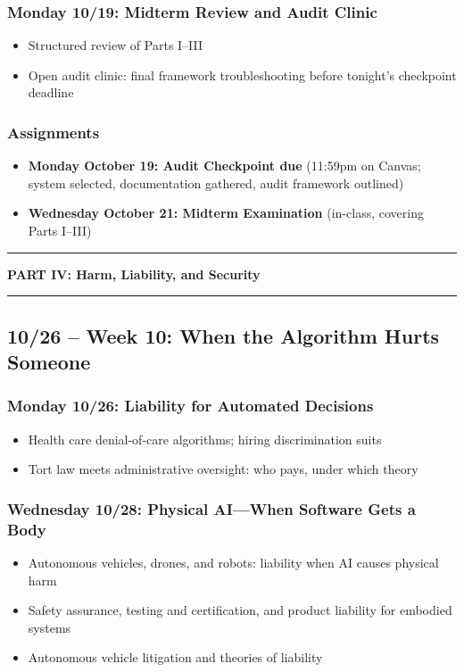 \documentclass[12pt]{article}
\begin{document}
    \subsubsection*{Monday 10/19: Midterm Review and Audit Clinic}
        \begin{itemize}
            \item Structured review of Parts I--III
            \item Open audit clinic: final framework troubleshooting before tonight's checkpoint deadline
        \end{itemize}
    \subsubsection*{Assignments}
        \begin{itemize}
            \item \textbf{Monday October 19: Audit Checkpoint due} (11:59pm on Canvas; system selected, documentation gathered, audit framework outlined)
            \item \textbf{Wednesday October 21: Midterm Examination} (in-class, covering Parts I--III)
        \end{itemize}

\bigskip
\noindent\rule{\textwidth}{0.6pt}
\begin{center}\textbf{PART IV: Harm, Liability, and Security}\end{center}
\noindent\rule{\textwidth}{0.6pt}

\subsection*{10/26 -- Week 10: When the Algorithm Hurts Someone}
    \subsubsection*{Monday 10/26: Liability for Automated Decisions}
        \begin{itemize}
            \item Health care denial-of-care algorithms; hiring discrimination suits
            \item Tort law meets administrative oversight: who pays, under which theory
        \end{itemize}
    \subsubsection*{Wednesday 10/28: Physical AI---When Software Gets a Body}
        \begin{itemize}
            \item Autonomous vehicles, drones, and robots: liability when AI causes physical harm
            \item Safety assurance, testing and certification, and product liability for embodied systems
            \item Autonomous vehicle litigation and theories of liability
        \end{itemize}
\end{document}
